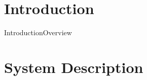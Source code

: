 \section{Introduction}

\begin{frame}{Introduction}{Overview}
  \begin{figure}[H]
	\centering
  \end{figure}
\end{frame}

\section{System Description}

